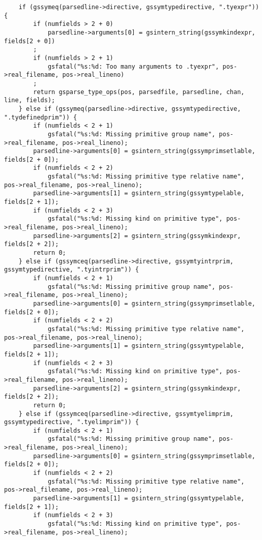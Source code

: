 \documentclass{report}
\begin{document}
\begin{verbatim}
    if (gssymeq(parsedline->directive, gssymtypedirective, ".tyexpr")) {
        if (numfields > 2 + 0)
            parsedline->arguments[0] = gsintern_string(gssymkindexpr, fields[2 + 0])
        ;
        if (numfields > 2 + 1)
            gsfatal("%s:%d: Too many arguments to .tyexpr", pos->real_filename, pos->real_lineno)
        ;
        return gsparse_type_ops(pos, parsedfile, parsedline, chan, line, fields);
    } else if (gssymeq(parsedline->directive, gssymtypedirective, ".tydefinedprim")) {
        if (numfields < 2 + 1)
            gsfatal("%s:%d: Missing primitive group name", pos->real_filename, pos->real_lineno);
        parsedline->arguments[0] = gsintern_string(gssymprimsetlable, fields[2 + 0]);
        if (numfields < 2 + 2)
            gsfatal("%s:%d: Missing primitive type relative name", pos->real_filename, pos->real_lineno);
        parsedline->arguments[1] = gsintern_string(gssymtypelable, fields[2 + 1]);
        if (numfields < 2 + 3)
            gsfatal("%s:%d: Missing kind on primitive type", pos->real_filename, pos->real_lineno);
        parsedline->arguments[2] = gsintern_string(gssymkindexpr, fields[2 + 2]);
        return 0;
    } else if (gssymceq(parsedline->directive, gssymtyintrprim, gssymtypedirective, ".tyintrprim")) {
        if (numfields < 2 + 1)
            gsfatal("%s:%d: Missing primitive group name", pos->real_filename, pos->real_lineno);
        parsedline->arguments[0] = gsintern_string(gssymprimsetlable, fields[2 + 0]);
        if (numfields < 2 + 2)
            gsfatal("%s:%d: Missing primitive type relative name", pos->real_filename, pos->real_lineno);
        parsedline->arguments[1] = gsintern_string(gssymtypelable, fields[2 + 1]);
        if (numfields < 2 + 3)
            gsfatal("%s:%d: Missing kind on primitive type", pos->real_filename, pos->real_lineno);
        parsedline->arguments[2] = gsintern_string(gssymkindexpr, fields[2 + 2]);
        return 0;
    } else if (gssymceq(parsedline->directive, gssymtyelimprim, gssymtypedirective, ".tyelimprim")) {
        if (numfields < 2 + 1)
            gsfatal("%s:%d: Missing primitive group name", pos->real_filename, pos->real_lineno);
        parsedline->arguments[0] = gsintern_string(gssymprimsetlable, fields[2 + 0]);
        if (numfields < 2 + 2)
            gsfatal("%s:%d: Missing primitive type relative name", pos->real_filename, pos->real_lineno);
        parsedline->arguments[1] = gsintern_string(gssymtypelable, fields[2 + 1]);
        if (numfields < 2 + 3)
            gsfatal("%s:%d: Missing kind on primitive type", pos->real_filename, pos->real_lineno);

\end{verbatim}
\end{document}

